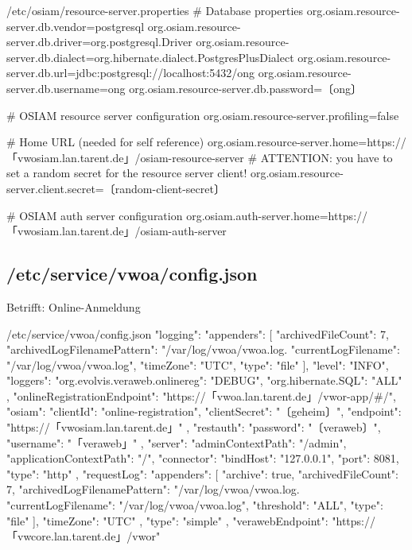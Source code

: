 \begin{lstdump}{/etc/osiam/resource-server.properties}
# Database properties
org.osiam.resource-server.db.vendor=postgresql
org.osiam.resource-server.db.driver=org.postgresql.Driver
org.osiam.resource-server.db.dialect=org.hibernate.dialect.PostgresPlusDialect
org.osiam.resource-server.db.url=jdbc:postgresql://localhost:5432/ong
org.osiam.resource-server.db.username=ong
org.osiam.resource-server.db.password=〔ong〕

# OSIAM resource server configuration
org.osiam.resource-server.profiling=false

# Home URL (needed for self reference)
org.osiam.resource-server.home=https://「vwosiam.lan.tarent.de」/osiam-resource-server
# ATTENTION: you have to set a random secret for the resource server client!
org.osiam.resource-server.client.secret=〔random-client-secret〕

# OSIAM auth server configuration
org.osiam.auth-server.home=https://「vwosiam.lan.tarent.de」/osiam-auth-server
\end{lstdump}

\subsection{/etc/service/vwoa/config.json}\label{subsec:refcfg-oa-cfg}

Betrifft: Online-Anmeldung

\begin{lstdump}{/etc/service/vwoa/config.json}
{
  "logging": {
    "appenders": [
      {
        "archivedFileCount": 7,
        "archivedLogFilenamePattern": "/var/log/vwoa/vwoa.log.%
        "currentLogFilename": "/var/log/vwoa/vwoa.log",
        "timeZone": "UTC",
        "type": "file"
      }
    ],
    "level": "INFO",
    "loggers": {
      "org.evolvis.veraweb.onlinereg": "DEBUG",
      "org.hibernate.SQL": "ALL"
    }
  },
  "onlineRegistrationEndpoint": "https://「vwoa.lan.tarent.de」/vwor-app/#/",
  "osiam": {
    "clientId": "online-registration",
    "clientSecret": "〔geheim〕",
    "endpoint": "https://「vwosiam.lan.tarent.de」"
  },
  "restauth": {
    "password": "〔veraweb〕",
    "username": "「veraweb」"
  },
  "server": {
    "adminContextPath": "/admin",
    "applicationContextPath": "/",
    "connector": {
      "bindHost": "127.0.0.1",
      "port": 8081,
      "type": "http"
    },
    "requestLog": {
      "appenders": [
        {
          "archive": true,
          "archivedFileCount": 7,
          "archivedLogFilenamePattern": "/var/log/vwoa/vwoa.log.%
          "currentLogFilename": "/var/log/vwoa/vwoa.log",
          "threshold": "ALL",
          "type": "file"
        }
      ],
      "timeZone": "UTC"
    },
    "type": "simple"
  },
  "verawebEndpoint": "https://「vwcore.lan.tarent.de」/vwor"
}
\end{lstdump}

